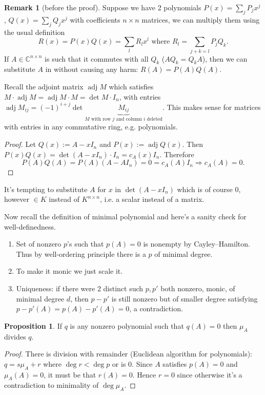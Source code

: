 \documentclass[a4paper]{article}
\newcommand{\adj}{\operatorname{adj}}
\theoremstyle{definition}
\newtheorem{prop}[defn]{Proposition}
\newtheorem*{remark}{Remark}
\begin{document}
\begin{remark} [before the proof]
	Suppose we have 2 polynomials $P(x)=\sum_j P_j x^j$, $Q(x)=\sum_j Q_j x^j$ with coefficients $n \times n$ matrices, we can multiply them using the usual definition
\[
R(x) = P(x)Q(x)=\sum_l R_l x^l \text{ where } R_l=\sum_{j+k=l} P_j Q_k .
\]
If $A \in \mathbb C^{n\times n}$ is such that it commutes with all $Q_k$ ($A Q_k = Q_k A$), then we can substitute $A$ in without causing any harm: $R(A)=P(A)Q(A) .$

	Recall the adjoint matrix $\adj M$ which satisfies $M \cdot \adj M = \adj M \cdot M = \det M \cdot I_n$, with entries $\adj M_{ij}=(-1)^{i+j} \det \underbrace{M_{ij}}_{M\text{ with row }j\text{ and column }i\text{ deleted}} .$ This makes sense for matrices with entries in any commutative ring, e.g. polynomials.
\end{remark}

\begin{proof}
Let $Q(x):=A - x I_n$ and $P(x):= \adj Q(x)$. Then $P(x)Q(x)=\det (A-xI_n) \cdot I_n=c_{A}(x)I_n$. Therefore
\[
P(A)Q(A)=P(A)(A-A I_n)=0=c_{A}(A)I_n \Rightarrow c_{A}(A)=0 .
\]
\end{proof}

It's tempting to substitute $A$ for $x$ in $\det (A-xI_n)$ which is of course $0$, however $\in K$ instead of $K^{n\times n}$, i.e. a scalar instead of a matrix.

Now recall the definition of minimal polynomial and here's a sanity check for well-definedness.

\begin{enumerate}
	\item Set of nonzero $p$'s such that $p(A)=0$ is nonempty by Cayley--Hamilton. Thus by well-ordering principle there is a $p$ of minimal degree.
	\item To make it monic we just scale it.
	\item Uniqueness: if there were 2 distinct such $p,p'$ both nonzero, monic, of minimal degree $d$, then $p-p'$ is still nonzero but of smaller degree satisfying $p-p'(A)=p(A)-p'(A)=0$, a contradiction.
\end{enumerate}

\begin{prop}
	If $q$ is any nonzero polynomial such that $q(A)=0$ then $\mu_{A}$ divides $q$.
\end{prop}

\begin{proof}
	There is division with remainder (Euclidean algorithm for polynomials): $q=s\mu_{A}+r$ where $\deg r < \deg p$ or is 0. Since $A$ satisfies $p(A)=0$ and $\mu_{A}(A)=0$, it must be that $r(A)=0$. Hence $r=0$ since otherwise it's a contradiction to minimality of $\deg \mu_{A}$.
\end{proof}
\end{document}
